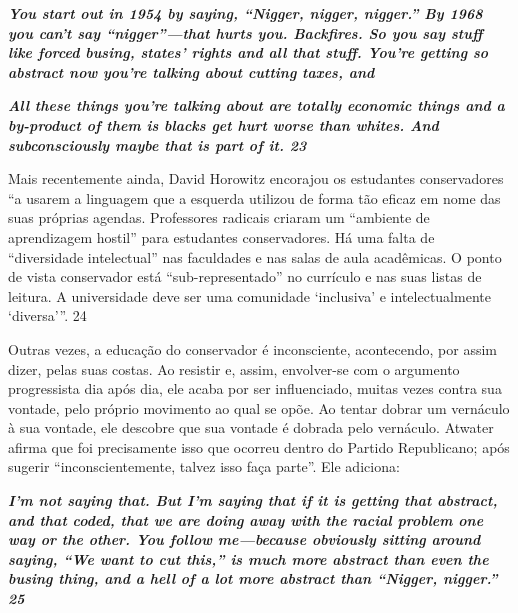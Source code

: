 \par
 

 \textbf{\textit{You start out in 1954 by saying, “Nigger, nigger, nigger.” By 1968 you can’t say “nigger”—that hurts you. Backfires. So you say stuff like forced busing, states’ rights and all that stuff. You’re getting so abstract now you’re talking about cutting taxes, and} }  
 
 
\par
 

 
\par
 

 \textbf{\textit{All these things you’re talking about are totally economic things and a by-product of them is blacks get hurt worse than whites. And subconsciously maybe that is part of it. {{\color{blue} 23} } } }  
 
 
\par
 
Mais recentemente ainda, David Horowitz encorajou os estudantes conservadores “a usarem a linguagem que a esquerda utilizou de forma tão eficaz em nome das suas próprias agendas. Professores radicais criaram um “ambiente de aprendizagem hostil” para estudantes conservadores. Há uma falta de “diversidade intelectual” nas faculdades e nas salas de aula acadêmicas. O ponto de vista conservador está “sub-representado” no currículo e nas suas listas de leitura. A universidade deve ser uma comunidade ‘inclusiva’ e intelectualmente ‘diversa’”.
 {\color{blue} 24}  

 
\par
 
Outras vezes, a educação do conservador é inconsciente, acontecendo, por assim dizer, pelas suas costas. Ao resistir e, assim, envolver-se com o argumento progressista dia após dia, ele acaba por ser influenciado, muitas vezes contra sua vontade, pelo próprio movimento ao qual se opõe. Ao tentar dobrar um vernáculo à sua vontade, ele descobre que sua vontade é dobrada pelo vernáculo. Atwater afirma que foi precisamente isso que ocorreu dentro do Partido Republicano; após sugerir “inconscientemente, talvez isso faça parte”. Ele adiciona:
 
\par
 

 \textbf{\textit{I’m not saying that. But I’m saying that if it is getting that abstract, and that coded, that we are doing away with the racial problem one way or the other. You follow me—because obviously sitting around saying, “We want to cut this,” is much more abstract than even the busing thing, and a hell of a lot more abstract than “Nigger, nigger.” {{\color{blue} 25} } } }  
 
